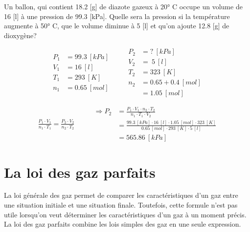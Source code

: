 \documentclass[
  11pt,
  a4paper,
  openany]{book}
\begin{document}
\begin{Exercise}

Un ballon, qui contient 18.2 {[}g{]} de diazote gazeux à 20° C occupe un volume de 16 {[}l{]} à une pression de 99.3 {[}kPa{]}. Quelle sera la pression si la température augmente à 50° C, que le volume diminue à 5 {[}l{]} et qu'on ajoute 12.8 {[}g{]} de dioxygène?


\end{Exercise}

\begin{Answer}
\[
\begin{split}
    P_1 &= 99.3\ [kPa]\\
    V_1 &= 16\ [l]\\
    T_1 &= 293\ [K]\\
    n_1 &= 0.65\ [mol]
\end{split}
\qquad
\begin{split}
    P_2 &= ?\ [kPa]\\
    V_2 &=\ 5\ [l]\\
    T_2 &= 323\ [K]\\
    n_2 &= 0.65 + 0.4\ [mol]\\
    &= 1.05\ [mol]
\end{split}
\]

\[
\begin{split}
    \frac{P_1 \cdot V_1}{n_1 \cdot T_1} = \frac{P_2 \cdot V_2}{n_2 \cdot T_2}
\end{split}
\qquad
\begin{split}
    \Rightarrow P_2 &= \frac{P_1 \cdot V_1 \cdot n_2 \cdot T_2}{n_1 \cdot T_1 \cdot V_2} \\
    &= \frac{99.3\ [kPa] \cdot 16\ [l] \cdot 1.05\ [mol] \cdot 323\ [K]}{0.65\ [mol] \cdot 293\ [K] \cdot 5\ [l]} \\
    &= 565.86\ [kPa]
\end{split}
\]

\end{Answer}

\newpage

\section{La loi des gaz parfaits}\label{la-loi-des-gaz-parfaits}

La loi générale des gaz permet de comparer les caractéristiques d'un gaz entre une situation initiale et une situation finale. Toutefois, cette formule n'est pas utile lorsqu'on veut déterminer les caractéristiques d'un gaz à un moment précis. La loi des gaz parfaits combine les lois simples des gaz en une seule expression.
\end{document}
